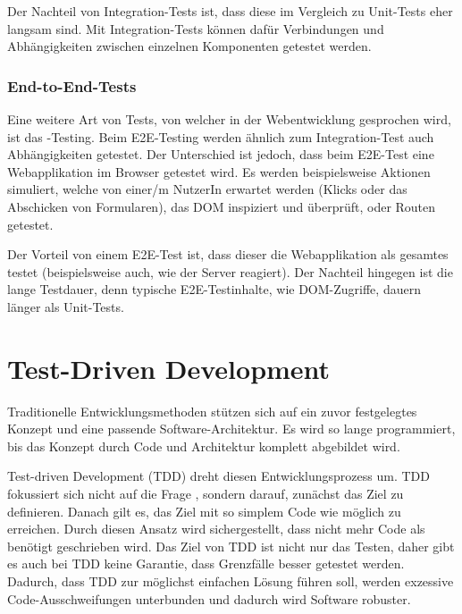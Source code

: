 Der Nachteil von Integration-Tests ist, dass diese im Vergleich zu Unit-Tests eher langsam sind. Mit Integration-Tests können dafür Verbindungen und Abhängigkeiten zwischen einzelnen Komponenten getestet werden. 

\subsubsection{End-to-End-Tests}
Eine weitere Art von Tests, von welcher in der Webentwicklung gesprochen wird, ist das -Testing. Beim E2E-Testing werden ähnlich zum Integration-Test auch Abhängigkeiten getestet. Der Unterschied ist jedoch, dass beim E2E-Test eine Webapplikation im Browser getestet wird. Es werden beispielsweise Aktionen simuliert, welche von einer/m NutzerIn erwartet werden (Klicks oder das Abschicken von Formularen), das DOM inspiziert und überprüft, oder Routen getestet.

Der Vorteil von einem E2E-Test ist, dass dieser die Webapplikation als gesamtes testet (beispielsweise auch, wie der Server reagiert).
Der Nachteil hingegen ist die lange Testdauer, denn typische E2E-Testinhalte, wie DOM-Zugriffe, dauern länger als Unit-Tests.

\newpage

\section{Test-Driven Development}
\label{section:Test-Driven Development}
\begin{center}
 \autocite[22]{Johansen:2011}
\end{center}
Traditionelle Entwicklungsmethoden stützen sich auf ein zuvor festgelegtes Konzept und eine passende Software-Architektur. Es wird so lange programmiert, bis das Konzept durch Code und Architektur komplett abgebildet wird.

Test-driven Development (TDD) dreht diesen Entwicklungsprozess um. TDD fokussiert sich nicht auf die Frage , sondern darauf, zunächst das Ziel zu definieren. Danach gilt es, das Ziel mit so simplem Code wie möglich zu erreichen. Durch diesen Ansatz wird sichergestellt, dass nicht mehr Code als benötigt geschrieben wird. Das Ziel von TDD ist nicht nur das Testen, daher gibt es auch bei TDD keine Garantie, dass Grenzfälle besser getestet werden. Dadurch, dass TDD zur möglichst einfachen Lösung führen soll, werden exzessive Code-Ausschweifungen unterbunden und dadurch wird Software robuster.

